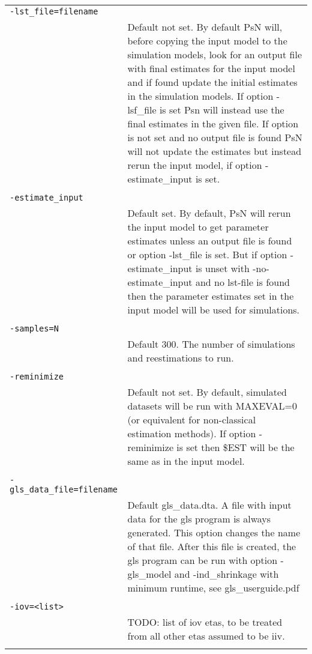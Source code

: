 \documentclass[a4paper,12pt]{article}
\begin{document}
\begin{longtable}{p{1in}p{4in}}
\verb|-lst_file=filename| & \\
\nopagebreak
 & Default not set. By default PsN will, before copying the input model to the simulation models, look for an output file with final estimates for the input model and if found update the initial estimates in the simulation models. If option -lsf\_file is set Psn will instead use the final estimates in the given file. If option is not set and no output file is found PsN will not update the estimates but instead rerun the input model, if option -estimate\_input is set. \\
\\
\verb|-estimate_input| & \\
\nopagebreak
 & Default set. By default, PsN will rerun the input model to get parameter estimates unless an output file is found or option -lst\_file is set. But if option -estimate\_input is unset with -no-estimate\_input and no lst-file is found then the parameter estimates set in the input model will be used for simulations. \\
\\
\verb|-samples=N| & \\
\nopagebreak
 & Default 300. The number of simulations and reestimations to run. \\
\\
\verb|-reminimize| & \\
\nopagebreak
 & Default not set. By default, simulated datasets will be run with MAXEVAL=0 (or equivalent for non-classical estimation methods). If option -reminimize is set then \$EST will be the same as in the input model. \\
\\
\verb|-gls_data_file=filename| & \\
\nopagebreak
 & Default gls\_data.dta. A file with input data for the gls program is always generated. This option changes the name of that file. After this file is created, the gls program can be run with option \mbox{-gls\_model} and -ind\_shrinkage with minimum runtime, see gls\_userguide.pdf \\
\\
\verb|-iov=<list>| & \\
\nopagebreak
 & TODO: list of iov etas, to be treated from all other etas assumed to be iiv. \\
\\
\end{longtable}
\end{document}
